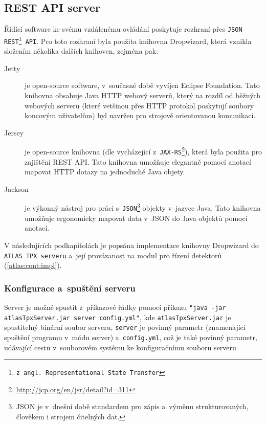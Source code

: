 \subsection{REST API server}\label{atlas:cont:api}
Řídící software ke svému vzdálenému ovládání poskytuje rozhraní přes \texttt{JSON REST\footnote{z angl. Representational State Transfer} API}. Pro toto rozhraní byla použita knihovna Dropwizard\cite{dropwizard}, která vznikla složením několika dalších knihoven, zejména pak:
\begin{description}
	\item[Jetty] je open-source software, v~současné době vyvíjen Eclipse Foundation. Tato knihovna obsahuje Java HTTP webový serverů, který na rozdíl od běžných webových serveru (které vetšinou přes HTTP protokol poskytují soubory koncovým uživatelům) byl navržen pro strojově orientovanou komunikaci.
	\item[Jersey] je open-source knihovna (dle \cite{dropwizard} vycházející z~\texttt{JAX-RS}\footnote{\url{http://jcp.org/en/jsr/detail?id=311}}), která byla použita pro zajištění REST API. Tato knihovna umožňuje elegantně pomocí anotací mapovat HTTP dotazy na jednoduché Java objety.
	\item[Jackson] je výkonný nástroj pro práci s~\texttt{JSON}\footnote{JSON je v~dnešní době standardem pro zápis a~výměnu strukturovaných, člověkem i strojem čitelných dat.} objekty v~jazyce Java. Tato knihovna umožňuje ergonomicky mapovat data v~JSON do Java objektů pomocí anotací.
\end{description}

V následujících podkapitolách je popsána implementace knihovny Dropwizard do \texttt{ATLAS TPX serveru} a~její provázanost na modul pro řízení detektorů (\ref{atlas:cont:impl}).

\subsubsection{Konfigurace a~spuštění serveru}\label{atlas:cont:api:conf}
Server je možné spustit z~příkazové řádky pomocí příkazu \texttt{"java -jar atlasTpxServer.jar server config.yml"}, kde \texttt{atlasTpxServer.jar} je spustitelný binární soubor serveru, \texttt{server} je povinný parametr (znamenající spuštění programu v~módu server) a~\texttt{config.yml}, což je také povinný parametr, udávající cestu v~souborovém systému ke konfiguračnímu souboru serveru.

